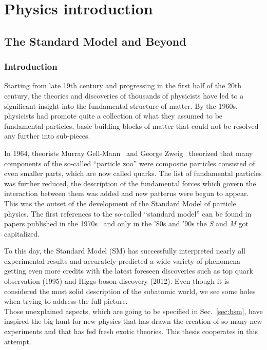 \part{Physics introduction}
\chapter{The Standard Model and Beyond} \label{Chapter1} 

\section{Introduction}
Starting from late 19th century and progressing in the first half of the 20th century, 
the theories and discoveries of thousands of physicists have led to a significant insight into the fundamental structure of matter. 
By the 1960s, physicists had promote quite a collection of what they assumed to be fundamental particles, basic building blocks of matter that could not be resolved any further into sub-pieces. 

In 1964, theorists Murray Gell-Mann~\cite{GELLMANN1964214} and George Zweig~\cite{Zweig:570209} theorized that many components of the so-called ``particle zoo'' were composite particles consisted of even smaller parts, which are now called quarks. The list of fundamental particles was further reduced, the description of the fundamental forces which govern the interaction between them was added and new patterns were begun to appear. This was the outset of the development of the Standard Model of particle physics.
The first references to the so-called “standard model” can be found in papers published in the 1970s~\cite{Pais:1975gn,PhysRevD.13.680} and only in the '80s and '90s the \emph{S} and \emph{M} got capitalized.

To this day, the Standard Model (SM) has successfully interpreted nearly all experimental results and accurately predicted a wide variety of phenomena getting even more credits with the latest foreseen discoveries such as top quark observation (1995) and Higgs boson discovery (2012). Even though it is considered the most solid description of the subatomic world, we see some holes when trying to address the full picture.\\
Those unexplained aspects, which are going to be specified in Sec.~\ref{sec:bsm}, have inspired the big hunt for new physics that has drawn the creation of so many new experiments and that has fed fresh exotic theories. This thesis cooperates in this attempt.


